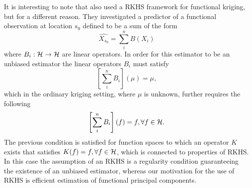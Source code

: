 It is interesting to note that \cite{Nerini:2010ba} also used a RKHS framework for functional kriging, but for a different reason. They investigated a predictor of a functional observation at location $s_0$ defined to be a sum of the form
\begin{equation}
	\widehat{X_{s_0}} = \sum_i^n B(X_i) \nonumber
\end{equation}
where $B_i: \mathcal{H} \rightarrow \mathcal{H}$ are linear operators. In order for this estimator to be an unbiased estimator the linear operators $B_i$ must satisfy
\begin{equation}
	\left[\sum_i^n B_i\right](\mu) = \mu, \nonumber
\end{equation}
which in the ordinary kriging setting, where $\mu$ is unknown, further requires the following
\begin{equation}
	\left[\sum_i^n B_i\right](f) = f, \forall f \in \mathcal{H}. \nonumber
\end{equation}
The previous condition is satisfied for function spaces to which an operator $K$ exists that satisfies $K(f) = f, \forall f\in \mathcal{H}$, which is connected to properties of RKHS. In this case the assumption of an RKHS is a regularity condition guaranteeing the existence of an unbiased estimator, whereas our motivation for the use of RKHS is efficient estimation of functional principal components. 

